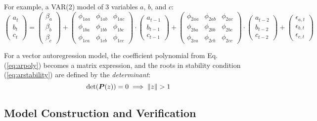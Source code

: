     For example, a VAR(2) model of 3 variables $a$, $b$, and $c$:
    \[ 
        \begin{pmatrix} a_t \\ b_t \\ c_t \end{pmatrix} = 
        \begin{pmatrix} \beta_{a} \\ \beta_{b} \\ \beta_{c} \end{pmatrix} +
        \begin{pmatrix}
            \phi_{1aa} & \phi_{1ab} & \phi_{1ac} \\
            \phi_{1ba} & \phi_{1bb} & \phi_{1bc} \\
            \phi_{1ca} & \phi_{1cb} & \phi_{1cc}
        \end{pmatrix} \cdot 
        \begin{pmatrix} a_{t-1} \\ b_{t-1} \\ c_{t-1} \end{pmatrix} + 
        \begin{pmatrix}
            \phi_{2aa} & \phi_{2ab} & \phi_{2ac} \\
            \phi_{2ba} & \phi_{2bb} & \phi_{2bc} \\
            \phi_{2ca} & \phi_{2cb} & \phi_{2cc}
        \end{pmatrix} \cdot 
        \begin{pmatrix} a_{t-2} \\ b_{t-2} \\ c_{t-2} \end{pmatrix} +
        \begin{pmatrix} \epsilon_{a,t} \\ \epsilon_{b,t} \\ \epsilon_{c,t} \end{pmatrix}
    \]
    
    For a vector autoregression model, the coefficient polynomial from Eq. (\ref{eq:arpoly})
    becomes a matrix expression, and the roots in stability condition (\ref{eq:arstability}) are
    defined by the \emph{determinant}:
    \begin{equation} \label{eq:varstability}
        \text{det}(\boldsymbol{P}(z)) = 0 \implies \| z \| > 1 
    \end{equation}

\subsection{Model Construction and Verification} \label{sec:modelcons}

